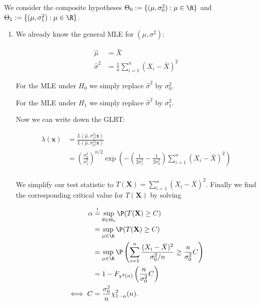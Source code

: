     \begin{solution}
    
    We consider the composite hypotheses $\Theta_0 := \{ (\mu, \sigma_0^2): \mu \in \R\}$
    and $\Theta_1 := \{ (\mu, \sigma_1^2): \mu \in \R \}$.

    \begin{enumerate}[label = (\alph*)]
        \item We already know the general MLE for $(\mu,\sigma^2)$:
        
        \begin{align*}
            \hat{\mu} &= \bar{X} \\
            \hat{\sigma}^2 &= \frac{1}{n}\sum_{i=1}^n (X_i - \bar{X})^2
        \end{align*}

        For the MLE under $H_0$ we simply replace $\hat{\sigma}^2$ by $\sigma_0^2$.

        For the MLE under $H_1$ we simply replace $\hat{\sigma}^2$ by $\sigma_1^2$.

        Now we can write down the GLRT:

        \begin{align*}
            \lambda(\textbf{x}) 
            &= \frac{L(\hat{\mu}, \sigma_1^2 | \textbf{x})}{L(\hat{\mu}, \sigma_0^2 | \textbf{x})} \\
            &= \left(\frac{\sigma_0^2}{\sigma_1^2}\right)^{n/2}
            \exp\left(-\left( \frac{1}{2\sigma_1^2} - \frac{1}{2\sigma_0^2}\right) \sum_{i=1}^n (X_i - \bar{X})^2\right) \\
        \end{align*}
  
        We simplify our test statistic to $T(\textbf{X}) = \sum_{i=1}^n (X_i - \bar{X})^2$.
        Finally we find the corresponding critical value for $T(\textbf{X})$ by solving

        \begin{align*}
            \alpha &\stackrel{!}{=} \sup_{\theta \in \Theta_0} \P(T(\textbf{X}) \geq C) \\
            &= \sup_{\mu \in \R} \P(T(\textbf{X}) \geq C) \\
            &= \sup_{\mu \in \R} \P\left(\sum_{i=1}^n \frac{(X_i - \bar{X})^2}{\sigma_0^2/n} \geq \frac{n}{\sigma_0^2}C\right) \\
            &= 1 - F_{\chi^2(n)}\left(\frac{n}{\sigma_0^2}C\right) \\
            \iff C &= \frac{\sigma_0^2}{n}\chi_{1 - \alpha}^2(n).
        \end{align*}


\end{enumerate}
\end{solution}
